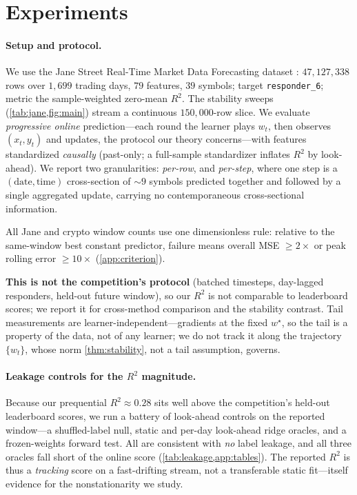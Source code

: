\documentclass{article}
\begin{document}
\section{Experiments}
\label{sec:experiments}

\paragraph{Setup and protocol.} We use the Jane Street Real-Time Market Data Forecasting
dataset \citep{janestreet2024}: $47{,}127{,}338$ rows over $1{,}699$ trading days, $79$
features, $39$ symbols; target \texttt{responder\_6}; metric the sample-weighted zero-mean
$R^2$. The stability sweeps (\cref{tab:jane,fig:main}) stream a continuous
$150{,}000$-row slice. We evaluate \emph{progressive online} prediction---each round the
learner plays $w_t$, then observes $(x_t,y_t)$ and updates, the protocol our theory
concerns---with features standardized \emph{causally} (past-only; a full-sample standardizer
inflates $R^2$ by look-ahead). We report two granularities: \emph{per-row}, and \emph{per-step}, where one
step is a $(\text{date},\text{time})$ cross-section of $\sim\!9$ symbols predicted together
and followed by a single aggregated update, carrying no contemporaneous cross-sectional
information.

All Jane and crypto window counts use one dimensionless rule: relative to the same-window best
constant predictor, failure means overall MSE $\ge2\times$ or peak rolling error $\ge10\times$
(\cref{app:criterion}).

\textbf{This is not the competition's protocol} (batched timesteps,
day-lagged responders, held-out future window), so our $R^2$ is not comparable to
leaderboard scores; we report it for cross-method comparison and the stability contrast.
Tail measurements are learner-independent---gradients at the fixed $w^\star$, so the tail is
a property of the data, not of any learner; we do not track it along the trajectory $\{w_t\}$,
whose norm \cref{thm:stability}, not a tail assumption, governs.

\paragraph{Leakage controls for the $R^2$ magnitude.} Because our prequential
$R^2\approx0.28$ sits well above the competition's held-out leaderboard scores, we run a
battery of look-ahead controls on the reported window---a shuffled-label null, static and
per-day look-ahead ridge oracles, and a frozen-weights forward test. All are consistent with
\emph{no} label leakage, and all three oracles fall short of the online score
(\cref{tab:leakage,app:tables}). The reported $R^2$ is thus a \emph{tracking} score on a
fast-drifting stream, not a transferable static fit---itself evidence for the nonstationarity
we study.
\end{document}
